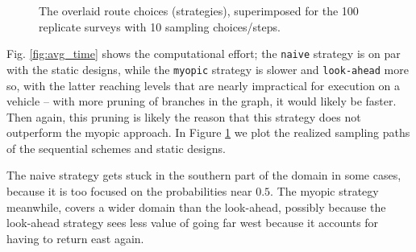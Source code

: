 \documentclass[aoas]{imsart}
\begin{document}
\begin{figure}[!b]
  \hfill
  \hfill
  \caption{The overlaid route choices (strategies), superimposed for
    the 100 replicate surveys with 10 sampling choices/steps.}
\label{fig:route_choices}
\end{figure}

Fig.  \ref{fig:avg_time} shows the computational effort; the
\texttt{naive} strategy is on par with the static designs, while the
\texttt{myopic} strategy is slower and \texttt{look-ahead} more so,
with the latter reaching levels that are nearly impractical for
execution on a vehicle -- with more pruning of branches in the graph,
it would likely be faster. Then again, this pruning is likely the
reason that this strategy does not outperform the myopic approach. In
Figure \ref{fig:route_choices} we plot the realized sampling paths of
the sequential schemes and static designs.

The naive strategy gets stuck in the southern part of the domain in
some cases, because it is too focused on the probabilities near
$0.5$. The myopic strategy meanwhile, covers a wider domain than the
look-ahead, possibly because the look-ahead strategy sees less value
of going far west because it accounts for having to return east again.
\end{document}
